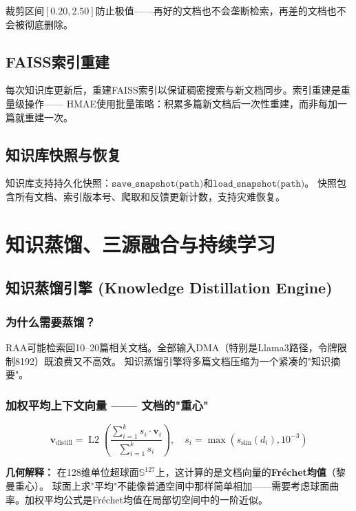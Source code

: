 \documentclass[11pt,a4paper]{ctexart}
\DeclareMathOperator{\Ltwo}{L2}
\begin{document}
裁剪区间$[0.20, 2.50]$防止极值——再好的文档也不会垄断检索，再差的文档也不会被彻底删除。

\subsection{FAISS索引重建}

每次知识库更新后，重建FAISS索引以保证稠密搜索与新文档同步。索引重建是重量级操作——
HMAE使用批量策略：积累多篇新文档后一次性重建，而非每加一篇就重建一次。

\subsection{知识库快照与恢复}

知识库支持持久化快照：$\texttt{save\_snapshot(path)}$和$\texttt{load\_snapshot(path)}$。
快照包含所有文档、索引版本号、爬取和反馈更新计数，支持灾难恢复。

\newpage

\section{知识蒸馏、三源融合与持续学习}

\subsection{知识蒸馏引擎 (Knowledge Distillation Engine)}

\subsubsection{为什么需要蒸馏？}

RAA可能检索回10--20篇相关文档。全部输入DMA（特别是Llama3路径，令牌限制8192）既浪费又不高效。
知识蒸馏引擎将多篇文档压缩为一个紧凑的"知识摘要"。

\subsubsection{加权平均上下文向量 —— 文档的"重心"}

$$\mathbf{v}_{\text{distill}} = \Ltwo\left(\frac{\sum_{i=1}^{k} s_i \cdot \mathbf{v}_i}{\sum_{i=1}^{k} s_i}\right), \quad s_i = \max(s_{\text{sim}}(d_i), 10^{-3})$$

\textbf{几何解释：} 在128维单位超球面$\mathbb{S}^{127}$上，这计算的是文档向量的\textbf{Fréchet均值}（黎曼重心）。
球面上求"平均"不能像普通空间中那样简单相加——需要考虑球面曲率。加权平均公式是Fréchet均值在局部切空间中的一阶近似。
\end{document}
